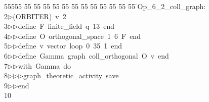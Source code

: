 %
%
\begin{tabbing}
55555 \= 55 \= 55 \= 55 \= 55 \= 55 \= 55 \= 55 \= 55 \= 55 \= 55 \= 55 \= 55 \= \>Op\_6\_2\_coll\_graph:\\[0pt]
2\>$\triangleright$\>(ORBITER)\ v\ 2\ \\[0pt]
3\>$\triangleright$\>$\triangleright$\>define\ F\ finite\_field\ q\ 13\ end\ \\[0pt]
4\>$\triangleright$\>$\triangleright$\>define\ O\ orthogonal\_space\ 1\ 6\ F\ end\ \\[0pt]
5\>$\triangleright$\>$\triangleright$\>define\ v\ vector\ loop\ 0\ 35\ 1\ end\ \\[0pt]
6\>$\triangleright$\>$\triangleright$\>define\ Gamma\ graph\ coll\_orthogonal\ O\ v\ end\ \\[0pt]
7\>$\triangleright$\>$\triangleright$\>with\ Gamma\ do\ \\[0pt]
8\>$\triangleright$\>$\triangleright$\>$\triangleright$\>graph\_theoretic\_activity\ save\ \\[0pt]
9\>$\triangleright$\>$\triangleright$\>end\\[0pt]
10\>\end{tabbing}
